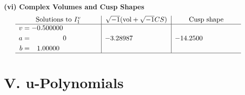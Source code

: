 \documentclass[1p]{elsarticle_modified}
\theoremstyle{definition}
\newcommand{\I}{\sqrt{-1}}
\begin{document}
\newpage\flushleft \textbf{(vi) Complex Volumes and Cusp Shapes}
$$\begin{array}{c|c|c}  
\text{Solutions to }I^v_{1}& \I (\text{vol} + \sqrt{-1}CS) & \text{Cusp shape}\\
 \hline 
\begin{aligned}
v &= -0.500000\phantom{ +0.000000I} \\
a &= \phantom{-0.000000 } 0 \\
b &= \phantom{-}1.00000\phantom{ +0.000000I}\end{aligned}
 & -3.28987\phantom{ +0.000000I} & -14.2500\phantom{ +0.000000I}\\
 \hline 
 \end{array}$$\newpage
\newpage\renewcommand{\arraystretch}{1}
\centering \section*{ V. u-Polynomials}
\end{document}
